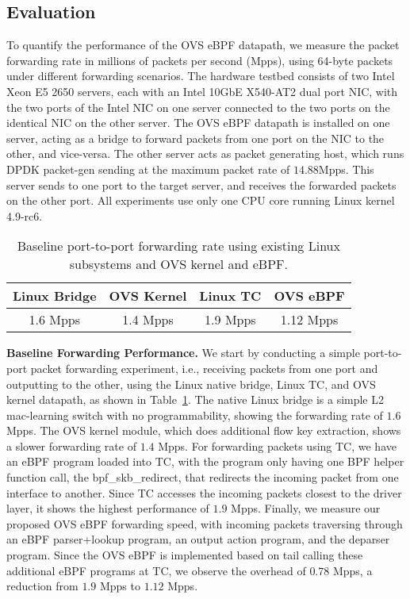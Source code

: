 \documentclass[10pt]{sigplanconf}
\begin{document}
\subsection{Evaluation}\label{evaluation}
To quantify the performance of the OVS eBPF datapath, we measure the packet
forwarding rate in millions of packets per second (Mpps), using 64-byte
packets under different forwarding scenarios. The hardware testbed
consists of two Intel Xeon E5 2650 servers, each with an Intel 10GbE
X540-AT2 dual port NIC, with the two ports of the Intel NIC on one server
connected to the two ports on the identical NIC on the other server. The
OVS eBPF datapath is installed on one server, acting as a bridge to
forward packets from one port on the NIC to the other, and vice-versa.
The other server acts as packet generating host, which runs DPDK
packet-gen sending at the maximum packet rate of
$14.88$Mpps. This server sends to one port to the target server, and
receives the forwarded packets on the other port. All experiments use
only one CPU core running Linux kernel 4.9-rc6.
\begin{table}
\centering
\small
\begin{tabular}{|c | c | c| c|}
\hline
 {\bf Linux Bridge} & {\bf OVS Kernel } & {\bf Linux TC} & {\bf OVS eBPF}\\ \hline
 1.6 Mpps & 1.4 Mpps & 1.9 Mpps & 1.12 Mpps\\ \hline
\end{tabular}
\caption{\footnotesize
Baseline port-to-port forwarding rate using existing Linux subsystems and
OVS kernel and eBPF.
}
\label{table:baseperf}
\end{table}

\textbf{Baseline Forwarding Performance.}
We start by conducting a simple port-to-port packet forwarding experiment,
i.e., receiving packets from one port and outputting to the other,
using the Linux native bridge, Linux TC, and OVS kernel datapath, as shown in
Table~\ref{table:baseperf}.
The native Linux bridge is a simple L2 mac-learning switch with no
programmability, showing the forwarding rate of $1.6$ Mpps.
The OVS kernel module, which does additional flow key extraction,
shows a slower forwarding rate of $1.4$ Mpps.
For forwarding packets using TC, we have an eBPF program loaded
into TC, with the program only having one BPF helper function call, the
bpf\_skb\_redirect, that redirects the incoming packet from one interface
to another.  Since TC accesses the incoming packets closest to the driver
layer, it shows the highest performance of $1.9$ Mpps.
Finally, we measure our proposed OVS eBPF forwarding speed,
with incoming packets traversing through an eBPF parser+lookup program,
an output action program, and the deparser program.
Since the OVS eBPF is implemented based on tail calling these
additional eBPF programs at TC, we observe the overhead of $0.78$ Mpps,
a reduction from $1.9$ Mpps to $1.12$ Mpps.
\end{document}
